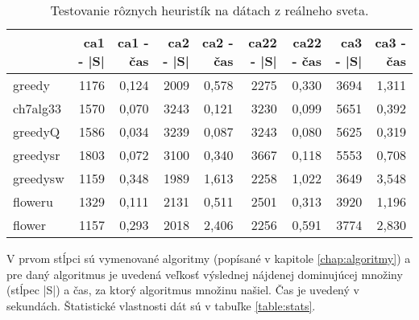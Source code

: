 \begin{table}[h]
	\centering
	\caption{Testovanie rôznych heuristík na dátach z reálneho sveta.}
	\begin{tabular}{l|rrrrrrrr}
		\hline
		         & ca1 - |S| & ca1 - čas & ca2 - |S| & ca2 - čas & ca22 - |S| & ca22 - čas & ca3 - |S| & ca3 - čas \\ \hline
		greedy   & 1176      & 0,124     & 2009      & 0,578     & 2275       & 0,330      & 3694      & 1,311     \\
		ch7alg33 & 1570      & 0,070     & 3243      & 0,121     & 3230       & 0,099      & 5651      & 0,392     \\
		greedyQ  & 1586      & 0,034     & 3239      & 0,087     & 3243       & 0,080      & 5625      & 0,319     \\
		greedysr & 1803      & 0,072     & 3100      & 0,340     & 3667       & 0,118      & 5553      & 0,708     \\
		greedysw & 1159      & 0,348     & 1989      & 1,613     & 2258       & 1,022      & 3649      & 3,548     \\
		floweru  & 1329      & 0,111     & 2131      & 0,511     & 2501       & 0,313      & 3920      & 1,196     \\
		flower   & 1157      & 0,293     & 2018      & 2,406     & 2256       & 0,591      & 3774      & 2,830     \\ \hline
	\end{tabular}
	\bigskip\par
	V prvom stĺpci sú vymenované algoritmy (popísané v kapitole 
	\ref{chap:algoritmy}) a pre daný algoritmus je uvedená veľkosť výslednej 
	nájdenej dominujúcej množiny (stĺpec |S|) a čas, za ktorý algoritmus 
	množinu našiel. Čas je uvedený v sekundách. Štatistické vlastnosti 
	dát sú v tabuľke \ref{table:stats}.
	\label{table:real}
\end{table}

